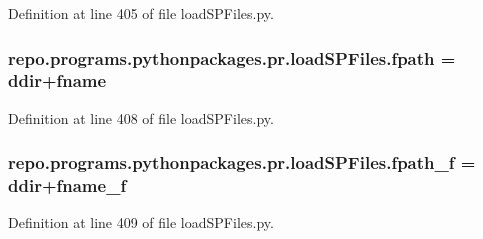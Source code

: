 Definition at line 405 of file load\-S\-P\-Files.\-py.

\hypertarget{namespacerepo_1_1programs_1_1pythonpackages_1_1pr_1_1loadSPFiles_a8ffbf3fed92bc26b4248caebb30ade38}{
\subsubsection[{fpath}]{\setlength{\rightskip}{0pt plus 5cm}repo.\-programs.\-pythonpackages.\-pr.\-load\-S\-P\-Files.\-fpath = {\bf ddir}+{\bf fname}}}\label{namespacerepo_1_1programs_1_1pythonpackages_1_1pr_1_1loadSPFiles_a8ffbf3fed92bc26b4248caebb30ade38}


Definition at line 408 of file load\-S\-P\-Files.\-py.

\hypertarget{namespacerepo_1_1programs_1_1pythonpackages_1_1pr_1_1loadSPFiles_a931d7ee8b1015ac25cbca6eee1f77bea}{
\subsubsection[{fpath\-\_\-f}]{\setlength{\rightskip}{0pt plus 5cm}repo.\-programs.\-pythonpackages.\-pr.\-load\-S\-P\-Files.\-fpath\-\_\-f = {\bf ddir}+{\bf fname\-\_\-f}}}\label{namespacerepo_1_1programs_1_1pythonpackages_1_1pr_1_1loadSPFiles_a931d7ee8b1015ac25cbca6eee1f77bea}


Definition at line 409 of file load\-S\-P\-Files.\-py.

